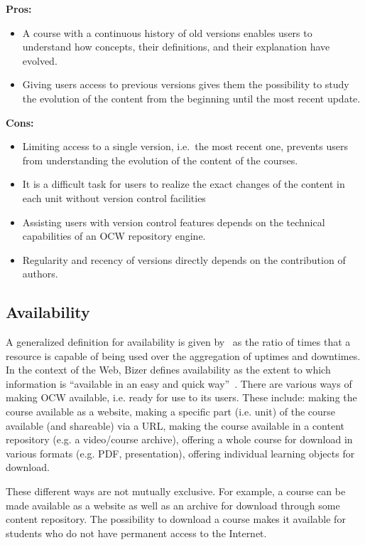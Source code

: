 \documentclass{sig-alternate}
\theoremstyle{definition}
\begin{document}
\noindent\textbf{Pros:}
\begin{itemize}
\item A course with a continuous history of old versions enables users to understand how concepts, their definitions, and their explanation have evolved.
\item Giving users access to previous versions gives them the possibility to study the evolution of the content from the beginning until the most recent update.
\end{itemize}
\noindent\textbf{Cons:}
\begin{itemize}
\item Limiting access to a single version, i.e.\ the most recent one, prevents users from understanding the evolution of the content of the courses.
\item It is a difficult task for users to realize the exact changes of the content in each unit without version control facilities
\item Assisting users with version control features depends on the technical capabilities of an OCW repository engine.
\item Regularity and recency of versions directly depends on the contribution of authors.
\end{itemize}

\subsection{Availability}
\label{sec:Availability}
A generalized definition for availability is given by~\parencite{Katukoori.1995} as the ratio of times that a resource is capable of being used over the aggregation of uptimes and downtimes.
In the context of the Web, Bizer defines availability as the extent to which information is ``available in an easy and quick way''~\parencite{Bizer2008:PhDThesis:biblatex}.
There are various ways of making OCW available, i.e. ready for use to its users.
These include: making the course available as a website, 
making a specific part (i.e. unit) of the course available (and shareable) via a URL,
making the course available in a content repository (e.g. a video/course archive),
offering a whole course for download in various formats (e.g. PDF, presentation),
offering individual learning objects for download.

These different ways are not mutually exclusive.
For example, a course can be made available as a website as well as an archive for download through some content repository.
The possibility to download a course makes it available for students who do not have permanent access to the Internet.
\end{document}
